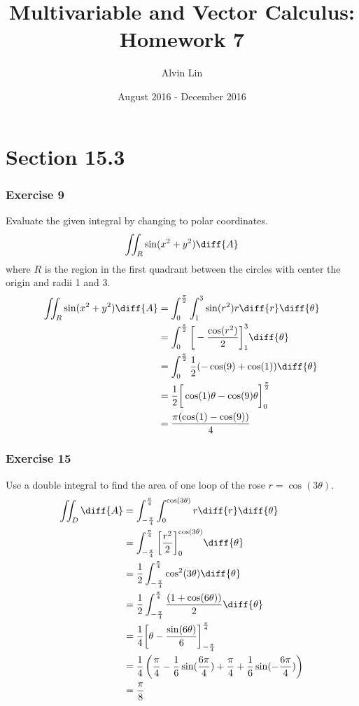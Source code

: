 \documentclass{math}
\title{Multivariable and Vector Calculus: Homework 7}
\author{Alvin Lin}
\date{August 2016 - December 2016}
\begin{document}
\maketitle

\section*{Section 15.3}

\subsubsection*{Exercise 9}
Evaluate the given integral by changing to polar coordinates.
\[ \iint_{R}\sin(x^2+y^2)\diff{A} \]
where \( R \) is the region in the first quadrant between the circles with
center the origin and radii 1 and 3.
\begin{align*}
  \iint_R\sin(x^2+y^2)\diff{A} &=
    \int_{0}^{\frac{\pi}{2}}\int_{1}^{3}\sin(r^2)r\diff{r}\diff{\theta} \\
  &= \int_{0}^{\frac{\pi}{2}}\bigg[-\frac{\cos(r^2)}{2}\bigg]_{1}^{3}
    \diff{\theta} \\
  &= \int_{0}^{\frac{\pi}{2}}\frac{1}{2}(-\cos(9)+\cos(1))\diff{\theta} \\
  &= \frac{1}{2}\bigg[\cos(1)\theta-\cos(9)\theta\bigg]_{0}^{\frac{\pi}{2}} \\
  &= \frac{\pi(\cos(1)-\cos(9))}{4}
\end{align*}

\subsubsection*{Exercise 15}
Use a double integral to find the area of one loop of the rose
\( r = \cos(3\theta) \).
\begin{align*}
  \iint_{D}\diff{A} &= \int_{-\frac{\pi}{4}}^{\frac{\pi}{4}}
    \int_{0}^{\cos(3\theta)}r\diff{r}\diff{\theta} \\
  &= \int_{-\frac{\pi}{4}}^{\frac{\pi}{4}}
    \bigg[\frac{r^2}{2}\bigg]_{0}^{\cos(3\theta)}\diff{\theta} \\
  &= \frac{1}{2}\int_{-\frac{\pi}{4}}^{\frac{\pi}{4}}
    \cos^2(3\theta)\diff{\theta} \\
  &= \frac{1}{2}\int_{-\frac{\pi}{4}}^{\frac{\pi}{4}}
    \frac{(1+\cos(6\theta))}{2}\diff{\theta} \\
  &= \frac{1}{4}\bigg[
    \theta-\frac{\sin(6\theta)}{6}\bigg]_{-\frac{\pi}{4}}^{\frac{\pi}{4}} \\
  &= \frac{1}{4}\left(\frac{\pi}{4}-\frac{1}{6}\sin(\frac{6\pi}{4})+
    \frac{\pi}{4}+\frac{1}{6}\sin(-\frac{6\pi}{4})\right) \\
  &= \frac{\pi}{8}
\end{align*}
\end{document}
